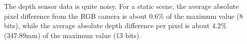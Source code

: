 The depth sensor data is quite noisy. For a static scene, the average absolute
pixel difference from the RGB camera is about 0.6\% of the maximum value (8
bits), while the average absolute depth difference per pixel is about 4.2\%
(347.89mm) of the maximum value (13 bits).
